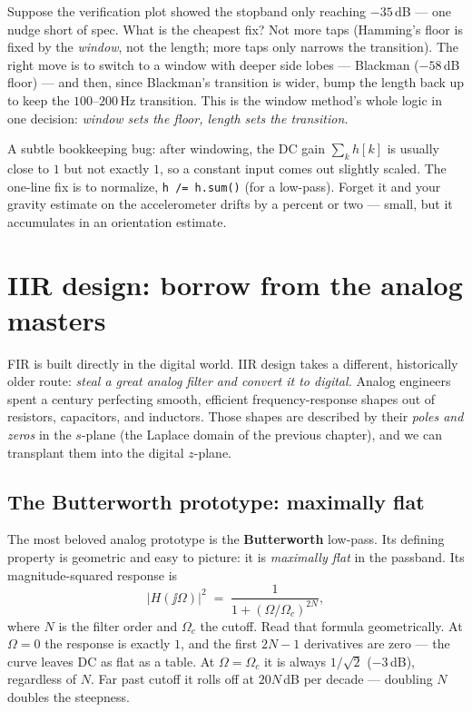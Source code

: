 \begin{walkbox}
Suppose the verification plot showed the stopband only reaching $-35$\,dB --- one
nudge short of spec. What is the cheapest fix? Not more taps (Hamming's floor is
fixed by the \emph{window}, not the length; more taps only narrows the
transition). The right move is to switch to a window with deeper side lobes ---
Blackman ($-58$\,dB floor) --- and then, since Blackman's transition is wider,
bump the length back up to keep the $100$--$200$\,Hz transition. This is the window
method's whole logic in one decision: \emph{window sets the floor, length sets the
transition.}
\end{walkbox}

\begin{trapbox}
A subtle bookkeeping bug: after windowing, the DC gain $\sum_k h[k]$ is usually
close to $1$ but not exactly $1$, so a constant input comes out slightly scaled.
The one-line fix is to normalize, \texttt{h /= h.sum()} (for a low-pass). Forget
it and your gravity estimate on the accelerometer drifts by a percent or two ---
small, but it accumulates in an orientation estimate.
\end{trapbox}

\section{IIR design: borrow from the analog masters}
\label{ch16:iir}

FIR is built directly in the digital world. IIR design takes a different,
historically older route: \emph{steal a great analog filter and convert it to
digital.} Analog engineers spent a century perfecting smooth, efficient
frequency-response shapes out of resistors, capacitors, and inductors. Those
shapes are described by their \emph{poles and zeros} in the $s$-plane (the Laplace
domain of the previous chapter), and we can transplant them into the digital
$z$-plane.

\subsection{The Butterworth prototype: maximally flat}
\label{ch16:butterworth}

The most beloved analog prototype is the \textbf{Butterworth} low-pass. Its
defining property is geometric and easy to picture: it is \emph{maximally flat} in
the passband. Its magnitude-squared response is
\[
|H(\jj\Omega)|^2 \;=\; \frac{1}{1 + (\Omega/\Omega_c)^{2N}},
\]
where $N$ is the filter order and $\Omega_c$ the cutoff. Read that formula
geometrically. At $\Omega = 0$ the response is exactly $1$, and the first $2N-1$
derivatives are zero --- the curve leaves DC as flat as a table. At $\Omega =
\Omega_c$ it is always $1/\sqrt2$ ($-3$\,dB), regardless of $N$. Far past cutoff it
rolls off at $20N$\,dB per decade --- doubling $N$ doubles the steepness.

